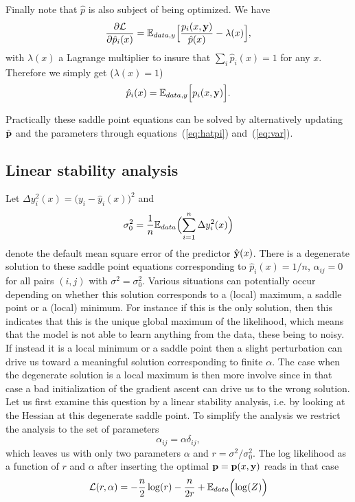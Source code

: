 \documentclass[envcountsect,runningheads]{llncs}
\theoremstyle{etoile}
\begin{document}
Finally note that $\hat p$ is also subject of being optimized. We have
\[
\frac{\partial{\cal L}}{\partial \hat p_i(x)} = {\mathbb E}_{data,y}\Bigl[\frac{p_i(x,{\bf y})}{\hat p(x)}-\lambda(x)\Bigr],
\]
with $\lambda(x)$ a Lagrange multiplier to insure that $\sum_i\hat p_i(x)=1$ for any $x$. Therefore we simply get ($\lambda(x)=1$)
\begin{equation}\label{eq:tildep}
\hat p_i(x) = {\mathbb E}_{data,y}\Bigl[p_i(x,{\bf y})\Bigr].
\end{equation}

Practically these saddle point equations can be solved by alternatively updating $\tilde {\bf p}$
and the parameters through equations~(\ref{eq:hatpi}) and~(\ref{eq:var}).

\subsection{Linear stability analysis}
Let $\Delta y_i^2(x)= \bigl(y_i-\hat y_i(x)\bigr)^2$ and
\[
\sigma_0^2 = \frac{1}{n}{\mathbb E}_{data}\Bigl(\sum_{i=1}^n \Delta y_i^2(x)\Bigr)
\]
denote the default mean square error of the predictor ${\hat {\bf y}}(x)$.
There is a degenerate solution to these saddle point equations corresponding to $\hat p_i(x) = 1/n$, $\alpha_{ij}=0$ for all
pairs $(i,j)$ with $\sigma^2=\sigma_0^2$. Various situations can potentially occur depending on whether this solution corresponds to a (local) maximum, a saddle point or a (local) 
minimum. For instance if this is the only solution, then this indicates that this is the unique global maximum of the likelihood, which means that the model is not able to learn
anything from the data, these being to noisy. If instead it is a local minimum or a saddle point then a slight perturbation can drive us toward a meaningful solution corresponding to finite $\alpha$.
The  case when the degenerate solution is a local maximum is then more involve since in that case a bad initialization of the gradient ascent can drive us to the wrong solution.
Let us first examine this question by a linear stability analysis, i.e. by looking at the Hessian at this degenerate saddle point. To simplify the analysis
we restrict the analysis to the set of parameters
\[
\alpha_{ij} = \alpha \delta_{ij},
\]
which leaves us with only two parameters $\alpha$ and $r = \sigma^2/\sigma_0^2$. The log likelihood as a function of $r$ and $\alpha$ after inserting the optimal
${\bf p} = {\bf p}(x,{\bf y})$ reads in that case
\[
{\cal L}(r,\alpha) = -\frac{n}{2}\log(r)-\frac{n}{2r}+{\mathbb E}_{data}\Bigl(\log(Z)\Bigr)
\]
\end{document}
